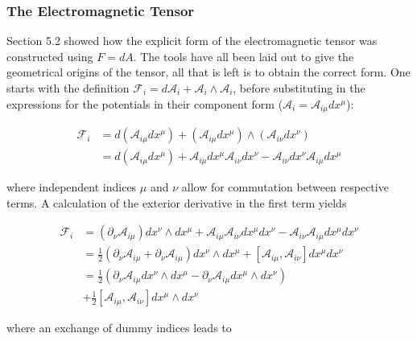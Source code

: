 \documentclass[fleqn, twocolumn, 10pt]{article}
\begin{document}

\subsubsection{The Electromagnetic Tensor}

Section 5.2 showed how the explicit form of the electromagnetic tensor was constructed using $F = dA$. The tools have all been laid out to give the geometrical origins of the tensor, all that is left is to obtain the correct form. One starts with the definition $\mathcal{F}_i = d\mathcal{A}_i + \mathcal{A}_i\land\mathcal{A}_i$, before substituting in the expressions for the potentials in their component form ($\mathcal{A}_i = \mathcal{A}_{i\mu}dx^\mu$):

\begin{ceqn}
\begin{align*}
\mathcal{F}_i &= d(\mathcal{A}_{i\mu}dx^\mu) + (\mathcal{A}_{i\mu}dx^\mu)\land(\mathcal{A}_{i\nu}dx^\nu)\\ 
&= d(\mathcal{A}_{i\mu}dx^\mu) + \mathcal{A}_{i\mu}dx^\mu\mathcal{A}_{i\nu}dx^\nu - \mathcal{A}_{i\nu}dx^\nu\mathcal{A}_{i\mu}dx^\mu
\end{align*}
\end{ceqn}
where independent indices $\mu$ and $\nu$ allow for commutation between respective terms. A calculation of the exterior derivative in the first term yields

\begin{ceqn}
\begin{align*}
\mathcal{F}_i &= (\partial_\nu\mathcal{A}_{i\mu})dx^\nu\land dx^\mu + \mathcal{A}_{i\mu}\mathcal{A}_{i\nu}dx^\mu dx^\nu  - \mathcal{A}_{i\nu}\mathcal{A}_{i\mu}dx^\mu dx^\nu\\
&= \frac{1}{2}(\partial_\nu\mathcal{A}_{i\mu} + \partial_\nu\mathcal{A}_{i\mu})dx^\nu\land dx^\mu + [\mathcal{A}_{i\mu}, \mathcal{A}_{i\nu}]dx^\mu dx^\nu\\ 
&= \frac{1}{2}(\partial_\nu\mathcal{A}_{i\mu}dx^\nu\land dx^\mu  - \partial_\nu\mathcal{A}_{i\mu}dx^\mu\land dx^\nu )\\ &+ \frac{1}{2}[\mathcal{A}_{i\mu}, \mathcal{A}_{i\nu}]dx^\mu\land dx^\nu 
\end{align*}
\end{ceqn}
where an exchange of dummy indices leads to
\end{document}
